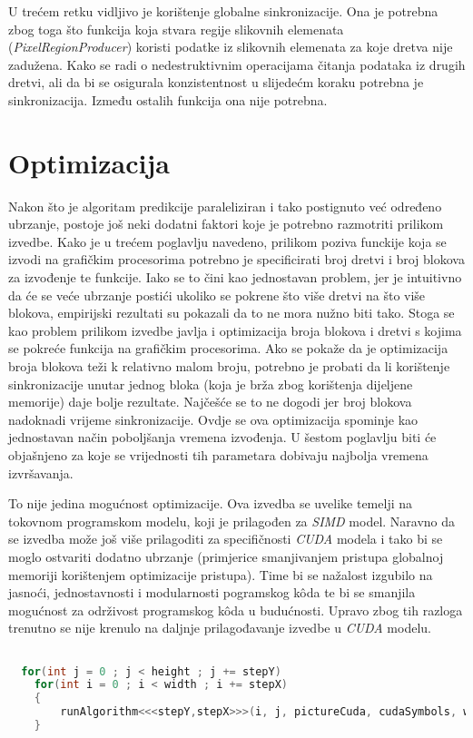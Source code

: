 \documentclass[times, utf8, zavrsni, numeric, sort]{fer}
\begin{document}
U trećem retku vidljivo je korištenje globalne sinkronizacije. Ona je potrebna zbog toga što funkcija koja stvara regije slikovnih elemenata (\emph{PixelRegionProducer}) koristi podatke iz slikovnih elemenata za koje dretva nije zadužena. Kako se radi o nedestruktivnim operacijama čitanja podataka iz drugih dretvi, ali da bi se osigurala konzistentnost u slijedećm koraku potrebna je sinkronizacija. Između ostalih funkcija ona nije potrebna.

\section{Optimizacija}
Nakon što je algoritam predikcije paraleliziran i tako postignuto već određeno ubrzanje, postoje još neki dodatni faktori koje je potrebno razmotriti prilikom izvedbe. Kako je u trećem poglavlju navedeno, prilikom poziva funckije koja se izvodi na grafičkim procesorima potrebno je specificirati broj dretvi i broj blokova za izvođenje te funkcije. Iako se to čini kao jednostavan problem, jer je intuitivno da će se veće ubrzanje postići ukoliko se pokrene što više dretvi na što više blokova, empirijski rezultati su pokazali da to ne mora nužno biti tako. Stoga se kao problem prilikom izvedbe javlja i optimizacija broja blokova i dretvi s kojima se pokreće funkcija na grafičkim procesorima. Ako se pokaže da je optimizacija broja blokova teži k relativno malom broju, potrebno je probati da li korištenje sinkronizacije unutar jednog bloka (koja je brža zbog korištenja dijeljene memorije) daje bolje rezultate. Najčešće se to ne dogodi jer broj blokova nadoknadi vrijeme sinkronizacije. Ovdje se ova optimizacija spominje kao jednostavan način poboljšanja vremena izvođenja.
U šestom poglavlju biti će objašnjeno za koje se vrijednosti tih parametara dobivaju najbolja vremena izvršavanja.

To nije jedina mogućnost optimizacije. Ova izvedba se uvelike temelji na tokovnom programskom modelu, koji je prilagođen za \emph{SIMD} model. Naravno da se izvedba može još više prilagoditi za specifičnosti \emph{CUDA} modela i tako bi se moglo ostvariti dodatno ubrzanje (primjerice smanjivanjem pristupa globalnoj memoriji korištenjem optimizacije pristupa). Time bi se nažalost izgubilo na jasnoći, jednostavnosti i modularnosti pogramskog k\^{o}da te bi se smanjila mogućnost za održivost programskog k\^{o}da u budućnosti. Upravo zbog tih razloga trenutno se nije krenulo na daljnje prilagođavanje izvedbe u \emph{CUDA} modelu.


\begin{singlespace}
\begin{lstlisting}[caption={Glavna funkcija koja se izvodi na grafičkom procesoru},label=	{kod:host}, language = {C}]

  for(int j = 0 ; j < height ; j += stepY)
  	for(int i = 0 ; i < width ; i += stepX)
    {
  		runAlgorithm<<<stepY,stepX>>>(i, j, pictureCuda, cudaSymbols, width, height, templsize, radius, cellsize, pixelRegionCuda);
    }

\end{lstlisting}
\end{singlespace}
\end{document}
